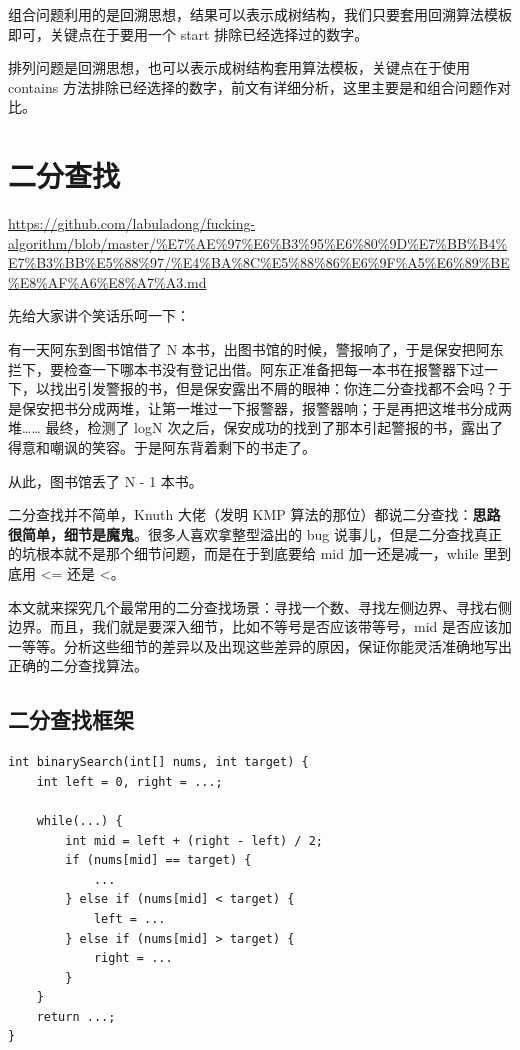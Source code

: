 \documentclass[12pt]{article}
\begin{document}
组合问题利用的是回溯思想，结果可以表示成树结构，我们只要套用回溯算法模板即可，关键点在于要用一个 start 排除已经选择过的数字。

排列问题是回溯思想，也可以表示成树结构套用算法模板，关键点在于使用 contains 方法排除已经选择的数字，前文有详细分析，这里主要是和组合问题作对比。

\section{二分查找}
\url{https://github.com/labuladong/fucking-algorithm/blob/master/%E7%AE%97%E6%B3%95%E6%80%9D%E7%BB%B4%E7%B3%BB%E5%88%97/%E4%BA%8C%E5%88%86%E6%9F%A5%E6%89%BE%E8%AF%A6%E8%A7%A3.md}

先给大家讲个笑话乐呵一下：

有一天阿东到图书馆借了 N 本书，出图书馆的时候，警报响了，于是保安把阿东拦下，要检查一下哪本书没有登记出借。阿东正准备把每一本书在报警器下过一下，以找出引发警报的书，但是保安露出不屑的眼神：你连二分查找都不会吗？于是保安把书分成两堆，让第一堆过一下报警器，报警器响；于是再把这堆书分成两堆…… 最终，检测了 logN 次之后，保安成功的找到了那本引起警报的书，露出了得意和嘲讽的笑容。于是阿东背着剩下的书走了。

从此，图书馆丢了 N - 1 本书。

二分查找并不简单，Knuth 大佬（发明 KMP 算法的那位）都说二分查找：\textbf{思路很简单，细节是魔鬼}。很多人喜欢拿整型溢出的 bug 说事儿，但是二分查找真正的坑根本就不是那个细节问题，而是在于到底要给 mid 加一还是减一，while 里到底用 <= 还是 <。

本文就来探究几个最常用的二分查找场景：寻找一个数、寻找左侧边界、寻找右侧边界。而且，我们就是要深入细节，比如不等号是否应该带等号，mid 是否应该加一等等。分析这些细节的差异以及出现这些差异的原因，保证你能灵活准确地写出正确的二分查找算法。

\subsection{二分查找框架}
\begin{lstlisting}
int binarySearch(int[] nums, int target) {
    int left = 0, right = ...;

    while(...) {
        int mid = left + (right - left) / 2;
        if (nums[mid] == target) {
            ...
        } else if (nums[mid] < target) {
            left = ...
        } else if (nums[mid] > target) {
            right = ...
        }
    }
    return ...;
}
\end{lstlisting}
\end{document}
